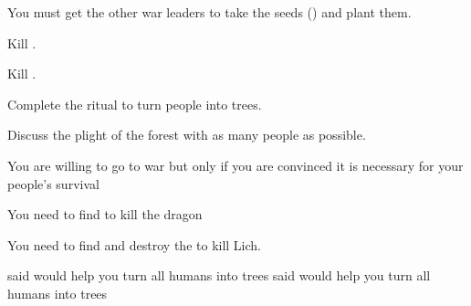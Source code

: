 \documentclass[char]{guildcamp2}
\begin{document}
\begin{itemz}[Goals]
  \item You must get the other war leaders to take the seeds (\iSeedoftheWorldTree{}) and plant them.
  \item Kill \cRed{}.
	\item Kill \cLich{}.
  \item Complete the ritual to turn people into trees.
	\item Discuss the plight of the forest with as many people as possible.
\end{itemz}

\begin{itemz}[Notes]
  \item You are willing to go to war but only if you are convinced it is necessary for your people's survival 
  \item You need to find \iSwordofIce{} to kill the dragon
	\item You need to find and destroy the \iPhylactery{} to kill Lich.
\end{itemz}

\begin{contacts}
  \contact{\cTreeFae{}} \cTreeFae{\They} said \cTreeFae{\they} would help you turn all humans into trees
  \contact{\cTroll{}} \cTroll{\They} said \cTroll{\they} would help you turn all humans into trees
\end{contacts}


\end{document}
